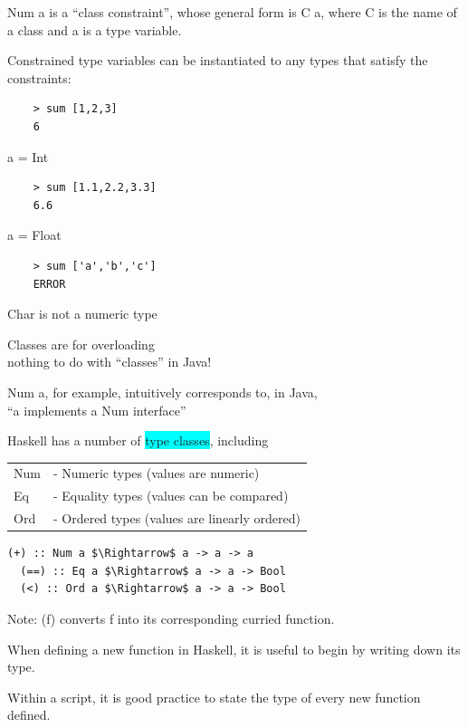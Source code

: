 \documentclass[tikz,border=10pt]{project_plan}
\begin{document}
Num a is a “class constraint”, whose general form is
C a, where C is the name of a class and a is a type
variable.

Constrained type variables can be instantiated to any
types that satisfy the constraints:

\begin{minipage}[]{.3\linewidth}
  \begin{lstlisting}
    > sum [1,2,3]
    6
  \end{lstlisting}
  a = Int
\end{minipage}
\hfill
\begin{minipage}[]{.3\linewidth}
  \begin{lstlisting}
    > sum [1.1,2.2,3.3]
    6.6
  \end{lstlisting}
  a = Float
\end{minipage}
\hfill
\begin{minipage}[]{.3\linewidth}
  \begin{lstlisting}
    > sum ['a','b','c']
    ERROR
  \end{lstlisting}
  Char is not a numeric type
\end{minipage}

Classes are for overloading\\
nothing to do with “classes” in Java!

Num a, for example, intuitively corresponds to, in Java,\\
“a implements a Num interface”

Haskell has a number of \colorbox{cyan}{type classes}, including

\begin{tabular}{l l}
  Num & - Numeric types (values are numeric)          \\
  Eq  & - Equality types (values can be compared)     \\
  Ord & - Ordered types (values are linearly ordered)
\end{tabular}

\begin{lstlisting}[mathescape]
  (+) :: Num a $\Rightarrow$ a -> a -> a
  (==) :: Eq a $\Rightarrow$ a -> a -> Bool
  (<) :: Ord a $\Rightarrow$ a -> a -> Bool
 \end{lstlisting}
Note: (f) converts f into its corresponding curried function.

When defining a new function in Haskell, it is
useful to begin by writing down its type.

Within a script, it is good practice to state the
type of every new function defined.
\end{document}

